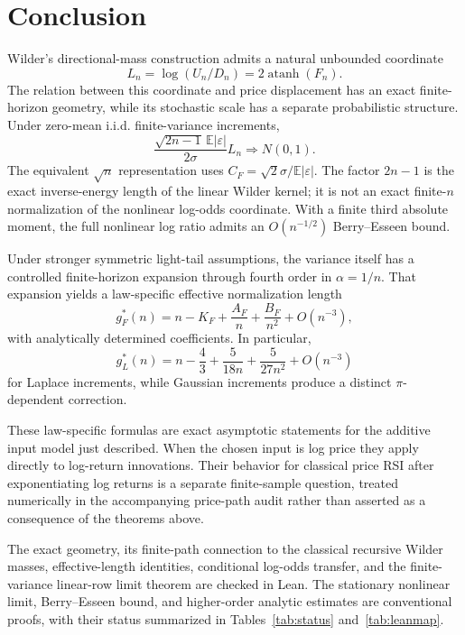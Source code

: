 \documentclass[11pt]{article}
\newcommand{\E}{\mathbb E}
\newcommand{\atanh}{\operatorname{atanh}}
\begin{document}
\section{Conclusion}
Wilder's directional-mass construction admits a natural unbounded coordinate
\begin{equation}
L_n=\log(U_n/D_n)=2\atanh(F_n).
\end{equation}
The relation between this coordinate and price displacement has an exact finite-horizon geometry, while its stochastic scale has a separate probabilistic structure. Under zero-mean i.i.d. finite-variance increments,
\begin{equation}
\frac{\sqrt{2n-1}\,\E|\varepsilon|}{2\sigma}L_n
\Rightarrow N(0,1).
\end{equation}
The equivalent $\sqrt n$ representation uses
$C_F=\sqrt2\sigma/\E|\varepsilon|$.  The factor $2n-1$ is the exact
inverse-energy length of the linear Wilder kernel; it is not an exact
finite-$n$ normalization of the nonlinear log-odds coordinate.
With a finite third absolute moment, the full nonlinear log ratio admits an $O(n^{-1/2})$ Berry--Esseen bound.

Under stronger symmetric light-tail assumptions, the variance itself has a controlled finite-horizon expansion through fourth order in $\alpha=1/n$. That expansion yields a law-specific effective normalization length
\begin{equation}
g_F^*(n)=n-K_F+\frac{A_F}{n}+\frac{B_F}{n^2}+O(n^{-3}),
\end{equation}
with analytically determined coefficients. In particular,
\begin{equation}
g_L^*(n)=n-\frac43+\frac{5}{18n}+\frac{5}{27n^2}+O(n^{-3})
\end{equation}
for Laplace increments, while Gaussian increments produce a distinct $\pi$-dependent correction.

These law-specific formulas are exact asymptotic statements for the additive
input model just described.  When the chosen input is log price they apply
directly to log-return innovations.  Their behavior for classical price RSI
after exponentiating log returns is a separate finite-sample question, treated
numerically in the accompanying price-path audit rather than asserted as a
consequence of the theorems above.

The exact geometry, its finite-path connection to the classical recursive
Wilder masses, effective-length identities, conditional log-odds transfer,
and the finite-variance linear-row limit theorem are checked in Lean.  The
stationary nonlinear limit, Berry--Esseen bound, and higher-order analytic
estimates are conventional proofs, with their status summarized in
Tables~\ref{tab:status} and~\ref{tab:leanmap}.
\end{document}
